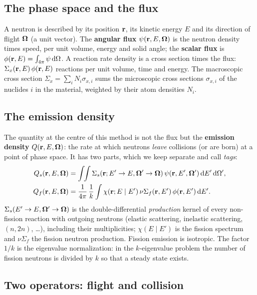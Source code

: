 \subsection{The phase space and the flux}

A neutron is described by its position $\mathbf r$, its kinetic energy $E$ and its direction of flight
$\boldsymbol\Omega$ (a unit vector). The \textbf{angular flux} $\psi(\mathbf r,E,\boldsymbol\Omega)$ is the neutron density times
speed, per unit volume, energy and solid angle; the \textbf{scalar flux} is
$\phi(\mathbf r,E)=\int_{4\pi}\psi\,\mathrm d\Omega$. A reaction rate density is a cross section times the flux:
$\Sigma_x(\mathbf r,E)\,\phi(\mathbf r,E)$ reactions per unit volume, time and energy. The macroscopic cross
section $\Sigma_x=\sum_i N_i\sigma_{x,i}$ sums the microscopic cross sections $\sigma_{x,i}$ of the
nuclides $i$ in the material, weighted by their atom densities $N_i$.

\subsection{The emission density}

The quantity at the centre of this method is not the flux but the \textbf{emission density}
$Q(\mathbf r,E,\boldsymbol\Omega)$: the rate at which neutrons \emph{leave} collisions (or are born) at a point of phase
space. It has two parts, which we keep separate and call \emph{tags}:
\begin{align}
Q_s(\mathbf r,E,\boldsymbol\Omega) &= \int\!\!\int \Sigma_s(\mathbf r; E'\to E, \boldsymbol\Omega'\to\boldsymbol\Omega)\,\psi(\mathbf r,E',\boldsymbol\Omega')\,\mathrm d E'\,\mathrm d\Omega',
\label{eq:Qs}\\
Q_f(\mathbf r,E,\boldsymbol\Omega) &= \frac{1}{4\pi}\,\frac{1}{k}\int \chi(\mathbf r; E\mid E')\,\nu\Sigma_f(\mathbf r,E')\,\phi(\mathbf r,E')\,\mathrm d E'.
\label{eq:Qf}
\end{align}
$\Sigma_s(E'\to E,\boldsymbol\Omega'\to\boldsymbol\Omega)$ is the double-differential \emph{production} kernel of every
non-fission reaction with outgoing neutrons (elastic scattering, inelastic scattering,
$(n,2n)$, \dots), including their multiplicities; $\chi(E\mid E')$ is the fission spectrum and
$\nu\Sigma_f$ the fission neutron production. Fission emission is isotropic. The factor $1/k$ is the
eigenvalue normalization: in the $k$-eigenvalue problem the number of fission neutrons is divided by
$k$ so that a steady state exists.

\subsection{Two operators: flight and collision}

